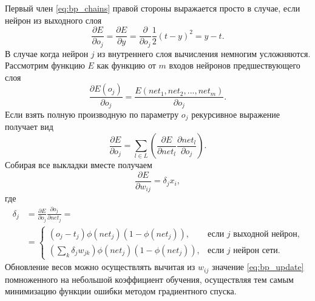 \documentclass[a4paper,10pt]{article}
\begin{document}
\indent Первый член \eqref{eq:bp_chains} правой стороны выражается просто в случае, если нейрон из выходного слоя
\begin{equation}
\frac{\partial E}{\partial o_{j}} = \frac{\partial E}{\partial y} = \frac{\partial}{\partial o_{j}} \frac{1}{2} (t-y)^2 = y - t  .
\end{equation}
\indent В случае когда нейрон $j$ из внутреннего слоя вычисления немногим усложняются. Рассмотрим функцию $E$ как функцию от $m$ входов нейронов предшествующего слоя
\begin{equation}
\frac{\partial E(o_{j})}{\partial o_{j}} = \frac{E(net_{1}, net_{2},...,net_{m})}{\partial o_{j}}.
\end{equation}
\indent Если взять полную производную по параметру $o_{j}$ рекурсивное выражение получает вид
\begin{equation}
\frac{\partial E}{\partial o_{j}} = \sum_{l\in L}\left(\frac{\partial E}{\partial net_{l}} \frac{\partial net_{l}}{\partial o_{j}}\right).
\end{equation}
\indent Собирая все выкладки вместе получаем
\begin{equation}\label{eq:bp_update}
\frac{\partial E}{\partial w_{ij}} = \delta_{j} x_{i},
\end{equation}
где
\begin{equation}
\begin{split}
\delta_{j} &= \frac{\partial E}{\partial o_{j}} \frac{\partial o_{j}}{\partial net_{j}} = \\ &=\begin{cases} (o_{j}-t_{j}) \phi(net_{j})(1-\phi(net_{j})), & \mbox{если }j\mbox{ выходной нейрон,} \\ (\sum_{k}\delta_{j}w_{jk})\phi(net_{j})(1-\phi(net_{j})), & \mbox{если }j\mbox{ нейрон сети.} \end{cases}
\end{split}
\end{equation}
\indent Обновление весов можно осуществлять вычитая из $w_{ij}$ значение \eqref{eq:bp_update} помноженного на небольшой коэффициент обучения, осуществляя тем самым минимизацию функции ошибки методом градиентного спуска.
\end{document}
